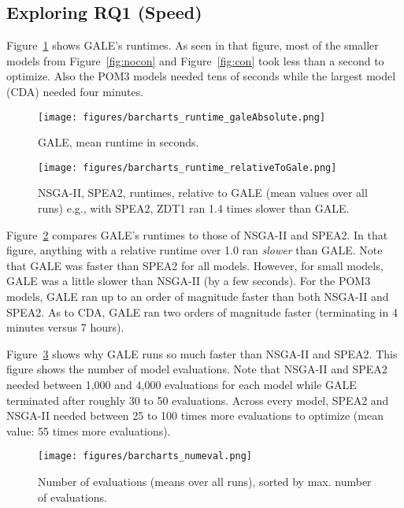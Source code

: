 \documentclass[10pt,journal,compsoc]{IEEEtran}
\newcommand{\fig}[1]{Figure~\ref{fig:#1}}
\begin{document}
 
\subsection{Exploring RQ1 (Speed)}

\fig{runGale} shows GALE's runtimes.
As seen in that figure,
most of the smaller models from \fig{nocon} and \fig{con} took less than a second to optimize. 
Also the POM3 models needed tens of seconds while the largest model (CDA) needed four minutes.



\begin{figure}[!h]
\texttt{[image: figures/barcharts\_runtime\_galeAbsolute.png]}
\caption{GALE, mean runtime in seconds.}\label{fig:runGale} 
\end{figure}






\begin{figure}[!h]
\texttt{[image: figures/barcharts\_runtime\_relativeToGale.png]}
\caption{NSGA-II, SPEA2, runtimes, relative to GALE (mean values
over all runs) e.g.,
with SPEA2, ZDT1 ran 1.4 times slower than GALE.}\label{fig:runSpea2} 
\end{figure}


\fig{runSpea2} compares GALE's runtimes to those
of NSGA-II and SPEA2. In that figure, anything with a relative
runtime over 1.0 ran {\em slower} than GALE. Note that 
GALE was faster than SPEA2 for all models. However,
for small models, GALE was a little slower than NSGA-II (by a few seconds).
For the POM3 models, GALE ran up to an order of magnitude faster than both NSGA-II and SPEA2.
As to CDA, GALE ran two orders of magnitude faster (terminating in 4 minutes versus 7 hours).



\fig{evals}  shows why GALE  runs so much faster than NSGA-II and SPEA2.
This figure shows the number of model evaluations.
Note that NSGA-II and SPEA2 needed between 1,000 and 4,000 evaluations for each model while GALE terminated after roughly 30 to 50 evaluations.
Across every model, SPEA2 and NSGA-II needed between 25 to 100 times more
evaluations to optimize (mean value: 55 times more evaluations).




\begin{figure}[!h]
\texttt{[image: figures/barcharts\_numeval.png]}
\caption{Number of evaluations (means over all runs), sorted
by  max. number of evaluations.}\label{fig:evals} 
\end{figure}
\end{document}
